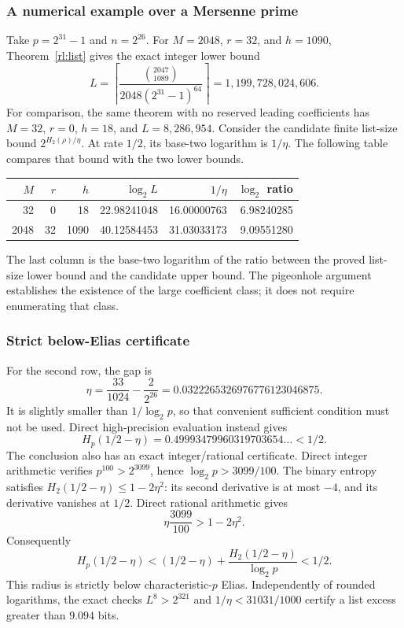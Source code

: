 \documentclass[11pt,letterpaper]{article}
\theoremstyle{definition}
\theoremstyle{remark}
\begin{document}
\subsubsection{A numerical example over a Mersenne prime}
\label{rl:parameters}
Take $p=2^{31}-1$ and $n=2^{26}$. For $M=2048$, $r=32$, and $h=1090$,
Theorem~\ref{rl:list} gives the exact integer lower bound
\[
 L=\left\lceil
 \frac{\binom{2047}{1089}}{2048(2^{31}-1)^{64}}
 \right\rceil
 =1{,}199{,}728{,}024{,}606.
\]
For comparison, the same theorem with no reserved leading coefficients
has $M=32$, $r=0$, $h=18$, and $L=8{,}286{,}954$. Consider the candidate
finite list-size bound $2^{H_2(\rho)/\eta}$. At rate $1/2$, its
base-two logarithm is $1/\eta$. The following table compares that bound
with the two lower bounds.
\begin{center}
\begin{tabular}{rrrrrr}
\hline
$M$ & $r$ & $h$ & $\log_2 L$ & $1/\eta$ & $\log_2$ ratio\\
\hline
32 & 0 & 18 & 22.98241048 & 16.00000763 & 6.98240285\\
2048 & 32 & 1090 & 40.12584453 & 31.03033173 & 9.09551280\\
\hline
\end{tabular}
\end{center}
The last column is the base-two logarithm of the ratio between the
proved list-size lower bound and the candidate upper bound. The
pigeonhole argument establishes the existence of the large coefficient
class; it does not require enumerating that class.

\subsubsection{Strict below-Elias certificate}
\label{rl:elias}
For the second row, the gap is
\[
 \eta=\frac{33}{1024}-\frac{2}{2^{26}}
 =0.0322265326976776123046875.
\]
It is slightly smaller than $1/\log_2 p$, so that convenient sufficient
condition must not be used. Direct high-precision evaluation instead gives
\[
 H_p(1/2-\eta)=0.49993479960319703654\ldots<1/2.
\]
The conclusion also has an exact integer/rational certificate. Direct
integer arithmetic verifies $p^{100}>2^{3099}$, hence
$\log_2 p>3099/100$. The binary entropy satisfies
$H_2(1/2-\eta)\le1-2\eta^2$: its second derivative is at most $-4$,
and its derivative vanishes at $1/2$. Direct rational arithmetic gives
\[
 \eta\frac{3099}{100}>1-2\eta^2.
\]
Consequently
\[
 H_p(1/2-\eta)
 < (1/2-\eta)+\frac{H_2(1/2-\eta)}{\log_2p}<1/2.
\]
This radius is strictly below characteristic-$p$ Elias. Independently of
rounded logarithms, the exact checks $L^8>2^{321}$ and
$1/\eta<31031/1000$ certify a list excess greater than $9.094$ bits.
\end{document}
